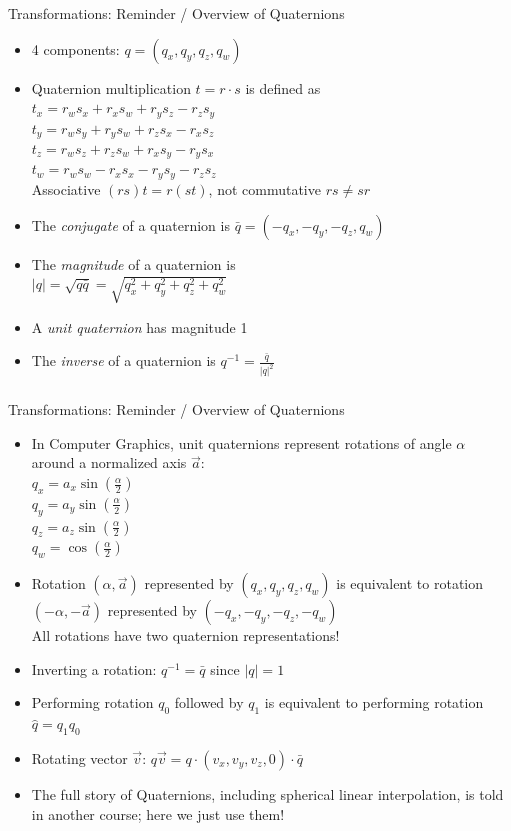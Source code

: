 \documentclass[utf8,stillsansserifmath,fleqn,t]{beamer}
\begin{document}
\begin{frame}
\frametitle{\insertsection}
Transformations: Reminder / Overview of Quaternions
\begin{itemize}
\item 4 components: $q=(q_x, q_y, q_z, q_w)$
\item Quaternion multiplication $t = r \cdot s$ is defined as\\
    $t_x = r_w s_x + r_x s_w + r_y s_z - r_z s_y$\\
    $t_y = r_w s_y + r_y s_w + r_z s_x - r_x s_z$\\
    $t_z = r_w s_z + r_z s_w + r_x s_y - r_y s_x$\\
    $t_w = r_w s_w - r_x s_x - r_y s_y - r_z s_z$\\
    Associative $(rs)t=r(st)$, not commutative $rs \neq sr$
\item The \emph{conjugate} of a quaternion is $\bar{q} = (-q_x, -q_y, -q_z, q_w)$
\item The \emph{magnitude} of a quaternion is\\
    $|q|=\sqrt{q\bar{q}} = \sqrt{q_x^2 + q_y^2 + q_z^2 + q_w^2}$
\item A \emph{unit quaternion} has magnitude 1
\item The \emph{inverse} of a quaternion is $q^{-1}=\frac{\bar{q}}{|q|^2}$
\end{itemize}
\end{frame}

\begin{frame}
\frametitle{\insertsection}
Transformations: Reminder / Overview of Quaternions
\begin{itemize}
\item In Computer Graphics, unit quaternions represent rotations
of angle $\alpha$ around a normalized axis $\vec{a}$:\\
    $q_x=a_x\sin\left(\frac{\alpha}{2}\right)$\\
    $q_y=a_y\sin\left(\frac{\alpha}{2}\right)$\\
    $q_z=a_z\sin\left(\frac{\alpha}{2}\right)$\\
    $q_w=\cos\left(\frac{\alpha}{2}\right)$
\item Rotation $(\alpha,\vec{a})$ represented by $(q_x,q_y,q_z,q_w)$
is equivalent to rotation $(-\alpha,-\vec{a})$ represented by
$(-q_x,-q_y,-q_z,-q_w)$\\
    All rotations have two quaternion representations!
\item Inverting a rotation: $q^{-1}=\bar{q}$ since $|q|=1$
\item Performing rotation $q_0$ followed by $q_1$ is equivalent to performing
rotation $\hat{q} = q_1 q_0$
\item Rotating vector $\vec{v}$: $q\vec{v} = q\cdot(v_x,v_y,v_z,0)\cdot\bar{q}$
\item The full story of Quaternions, including spherical linear interpolation,
is told in another course; here we just use them!
\end{itemize}
\end{frame}
\end{document}
